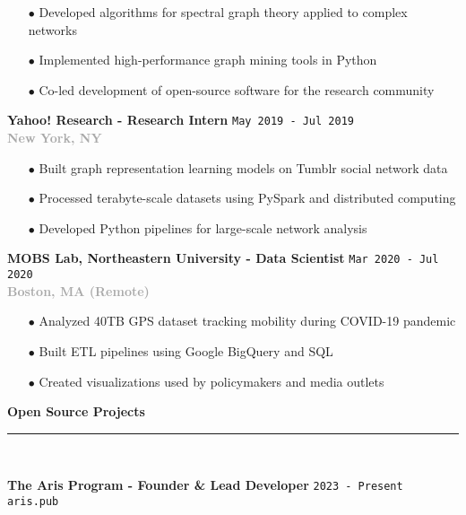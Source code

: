 \documentclass[11pt,a4paper]{article}
\newcommand{\sectiondivider}{%
    \vspace{2pt}\\%
    {\color{verdigris}\rule{30pt}{2pt}}\\%
    \vspace{8pt}%
}
\newcommand{\verdigrisbullet}{{\color{verdigris}$\bullet$}\space}
\newcommand{\jobduration}[1]{%
    \textcolor{mediumgray}{\texttt{\small #1}}%
}
\newcommand{\companyname}[1]{%
    \textcolor{darkgray}{\textbf{#1}}%
}
\newcommand{\cvsectioncustom}[1]{%
    \vspace{12pt}%
    {\Large\color{navy}\textbf{#1}}%
    \sectiondivider%
}
\begin{document}
\begin{itemize}[leftmargin=15pt,itemsep=3pt]
    \item[\verdigrisbullet] Developed algorithms for spectral graph theory applied to complex networks
    \item[\verdigrisbullet] Implemented high-performance graph mining tools in Python
    \item[\verdigrisbullet] Co-led development of open-source software for the research community
\end{itemize}

\vspace{8pt}

\textbf{\large\color{navy}Yahoo! Research - Research Intern} \hfill \jobduration{May 2019 - Jul 2019}\\
\companyname{New York, NY}

\begin{itemize}[leftmargin=15pt,itemsep=3pt]
    \item[\verdigrisbullet] Built graph representation learning models on Tumblr social network data
    \item[\verdigrisbullet] Processed terabyte-scale datasets using PySpark and distributed computing
    \item[\verdigrisbullet] Developed Python pipelines for large-scale network analysis
\end{itemize}

\vspace{8pt}

\textbf{\large\color{navy}MOBS Lab, Northeastern University - Data Scientist} \hfill \jobduration{Mar 2020 - Jul 2020}\\
\companyname{Boston, MA (Remote)}

\begin{itemize}[leftmargin=15pt,itemsep=3pt]
    \item[\verdigrisbullet] Analyzed 40TB GPS dataset tracking mobility during COVID-19 pandemic
    \item[\verdigrisbullet] Built ETL pipelines using Google BigQuery and SQL
    \item[\verdigrisbullet] Created visualizations used by policymakers and media outlets
\end{itemize}

\cvsectioncustom{Open Source Projects}

\textbf{\large\color{navy}The Aris Program - Founder \& Lead Developer} \hfill \jobduration{2023 - Present}\\
{\textcolor{verdigris}{\texttt{aris.pub}}}
\end{document}
